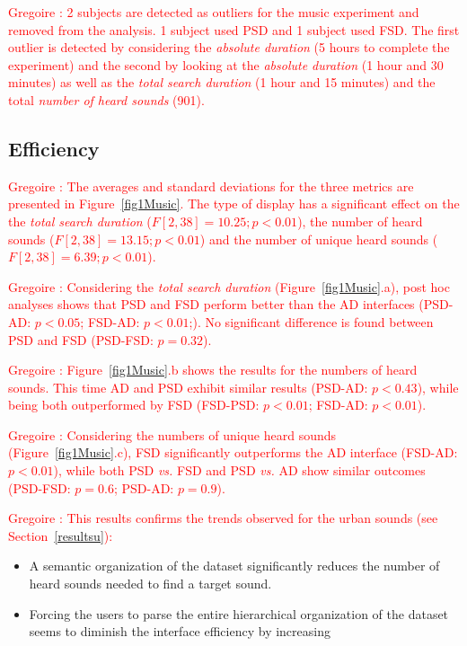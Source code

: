\documentclass{aes2e}
\newcommand{\gl}[1]{\textcolor{red}{Gregoire : #1}}
\begin{document}
\gl{2 subjects are detected as outliers for the music experiment and removed from the analysis. 1 subject used PSD and 1 subject used FSD. The first outlier is detected by considering the \textit{absolute duration} (5 hours to complete the experiment) and the second by looking at the \textit{absolute duration} (1 hour and 30 minutes) as well as the \textit{total search duration} (1 hour and 15 minutes) and the total \textit{number of heard sounds} (901).}

\subsection{Efficiency}

\gl{The averages and standard deviations for the three metrics are presented in Figure~\ref{fig1Music}. The type of display has a significant effect on the the \textit{total search duration} ($F[2,38]=10.25; p<0.01$), the number of heard sounds ($F[2,38]=13.15; p<0.01$) and the number of unique heard sounds ($F[2,38]=6.39; p<0.01$). }

\gl{Considering the \textit{total search duration} (Figure~\ref{fig1Music}.a), post hoc analyses shows that PSD and FSD perform better than the AD interfaces (PSD-AD: $p<0.05$; FSD-AD: $p<0.01$;). No significant difference is found between PSD and FSD (PSD-FSD: $p=0.32$). }

\gl{Figure~\ref{fig1Music}.b shows the results for the numbers of heard sounds. This time AD and PSD exhibit similar results (PSD-AD: $p<0.43$), while being both outperformed by FSD (FSD-PSD: $p<0.01$; FSD-AD: $p<0.01$).  }

\gl{Considering the numbers of unique heard sounds (Figure~\ref{fig1Music}.c), FSD significantly outperforms the AD interface (FSD-AD: $p<0.01$), while both PSD \emph{vs.} FSD and PSD \emph{vs.} AD show similar outcomes (PSD-FSD: $p=0.6$; PSD-AD: $p=0.9$).}

\gl{This results confirms the trends observed for the urban sounds (see Section~\ref{resultsu}):}

\begin{itemize}
\item A semantic organization of the dataset significantly reduces  the number of heard sounds needed to find a target sound.
\item Forcing the users to parse the entire hierarchical organization of the dataset seems to diminish the interface efficiency by increasing
\end{itemize}
\end{document}
